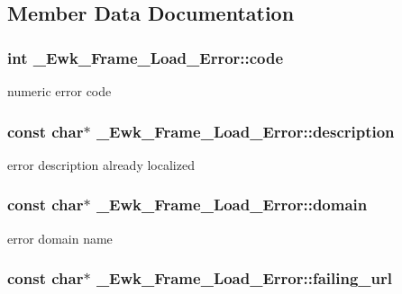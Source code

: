 \subsection{Member Data Documentation}
\hypertarget{struct__Ewk__Frame__Load__Error_a15be8c88263d19ad8671c037f69914a5}{
\subsubsection[{code}]{\setlength{\rightskip}{0pt plus 5cm}int \+\_\+\+Ewk\+\_\+\+Frame\+\_\+\+Load\+\_\+\+Error\+::code}}\label{struct__Ewk__Frame__Load__Error_a15be8c88263d19ad8671c037f69914a5}
numeric error code \hypertarget{struct__Ewk__Frame__Load__Error_aa60f960a10b3296d6d22f75857f3232d}{
\subsubsection[{description}]{\setlength{\rightskip}{0pt plus 5cm}const char$\ast$ \+\_\+\+Ewk\+\_\+\+Frame\+\_\+\+Load\+\_\+\+Error\+::description}}\label{struct__Ewk__Frame__Load__Error_aa60f960a10b3296d6d22f75857f3232d}
error description already localized \hypertarget{struct__Ewk__Frame__Load__Error_acced5cec39060d9e982a6b777b1fffea}{
\subsubsection[{domain}]{\setlength{\rightskip}{0pt plus 5cm}const char$\ast$ \+\_\+\+Ewk\+\_\+\+Frame\+\_\+\+Load\+\_\+\+Error\+::domain}}\label{struct__Ewk__Frame__Load__Error_acced5cec39060d9e982a6b777b1fffea}
error domain name \hypertarget{struct__Ewk__Frame__Load__Error_a56036e422a54ec3329cef5120b3cde52}{
\subsubsection[{failing\+\_\+url}]{\setlength{\rightskip}{0pt plus 5cm}const char$\ast$ \+\_\+\+Ewk\+\_\+\+Frame\+\_\+\+Load\+\_\+\+Error\+::failing\+\_\+url}}\label{struct__Ewk__Frame__Load__Error_a56036e422a54ec3329cef5120b3cde52}
